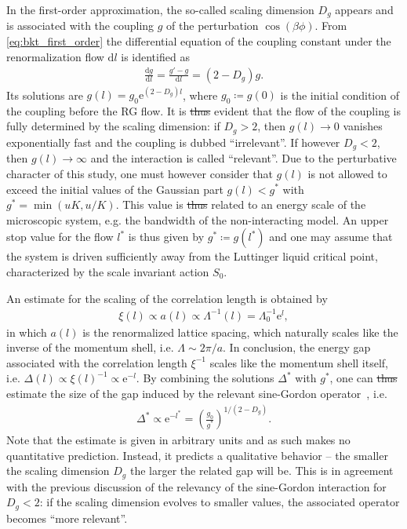 \documentclass{svmono}
\def\re{\mathrm e}
\def\rd{\mathrm d}
\newcommand{\brlr}[1]{\left( #1 \right)}
\providecommand{\DIFdeltex}[1]{{\protect\color{red}\sout{#1}}}                      %
\providecommand{\DIFdelbegin}{} %
\providecommand{\DIFdelend}{} %
\providecommand{\DIFdel}[1]{\texorpdfstring{\DIFdeltex{#1}}{}} %
\newcommand{\DIFscaledelfig}{0.5}
\newlength{\DIFdelgraphicswidth} %
\newlength{\DIFdelgraphicsheight} %
\newcommand{\DIFdelincludegraphics}[2][]{%
\sbox{\DIFdelgraphicsbox}{\DIFOincludegraphics[#1]{#2}}%
\settoboxwidth{\DIFdelgraphicswidth}{\DIFdelgraphicsbox} %
\settoboxtotalheight{\DIFdelgraphicsheight}{\DIFdelgraphicsbox} %
\scalebox{\DIFscaledelfig}{%
\parbox[b]{\DIFdelgraphicswidth}{\usebox{\DIFdelgraphicsbox}\\[-\baselineskip] \rule{\DIFdelgraphicswidth}{0em}}\llap{\resizebox{\DIFdelgraphicswidth}{\DIFdelgraphicsheight}{%
\setlength{\unitlength}{\DIFdelgraphicswidth}%
\begin{picture}(1,1)%
\thicklines\linethickness{2pt} %
{\color[rgb]{1,0,0}\put(0,0){\framebox(1,1){}}}%
{\color[rgb]{1,0,0}\put(0,0){\line( 1,1){1}}}%
{\color[rgb]{1,0,0}\put(0,1){\line(1,-1){1}}}%
\end{picture}%
}\hspace*{3pt}}} %
} %
\DeclareRobustCommand{\DIFdelbegin}{\DIFOdelbegin \let\includegraphics\DIFdelincludegraphics} %
\DeclareRobustCommand{\DIFdelend}{\DIFOaddend \let\includegraphics\DIFOincludegraphics} %
\begin{document}
In the first-order approximation, the so-called scaling dimension $D_g$ appears and is associated with the coupling $g$ of the perturbation $\cos(\beta\phi)$.
From \cref{eq:bkt_first_order} the differential equation of the coupling constant under the renormalization flow $\rd l$ is identified as
\begin{align}
    \frac{\rd g}{\rd l} = \frac{g'-g}{\rd l} = (2-D_g)g.
\end{align}
Its solutions are $g(l) = g_0\re^{(2-D_g)l}$, where $g_0\coloneqq g(0)$ is the initial condition of the coupling before the RG flow.
It is \DIFdelbegin \DIFdel{thus }\DIFdelend evident that the flow of the coupling is fully determined by the scaling dimension: if $D_g>2$, then $g(l)\rightarrow0$ vanishes exponentially fast and the coupling is dubbed ``irrelevant''.
If however $D_g<2$, then $g(l)\rightarrow\infty$ and the interaction is called ``relevant''.
Due to the perturbative character of this study, one must however consider that $g(l)$ is not allowed to exceed the initial values of the Gaussian part $g(l)<g^*$ with $g^*=\min(uK,u/K)$.
This value is \DIFdelbegin \DIFdel{thus }\DIFdelend related to an energy scale of the microscopic system, e.g. the bandwidth of the non-interacting model.
An upper stop value for the flow $l^*$ is thus given by $g^*\coloneqq g(l^*)$ and one may assume that the system is driven sufficiently away from the Luttinger liquid critical point, characterized by the scale invariant action $S_0$.

An estimate for the scaling of the correlation length is obtained by
\begin{align}
    \xi(l) \propto a(l) \propto \Lambda^{-1}(l) = \Lambda^{-1}_0\re^{l},
    \label{eq:correlation_length_rg_flow}
\end{align}
in which $a(l)$ is the renormalized lattice spacing, which naturally scales like the inverse of the momentum shell, i.e. $\Lambda\sim2\pi/a$.
In conclusion, the energy gap associated with the correlation length $\xi^{-1}$ scales like the momentum shell itself, i.e. $\Delta(l)\propto\xi(l)^{-1}\propto\re^{-l}$.
By combining the solutions $\Delta^*$ with $g^*$, one can \DIFdelbegin \DIFdel{thus }\DIFdelend estimate the size of the gap induced by the relevant sine-Gordon operator~\cite{Gogolin2004}, i.e.
\begin{align}
    {\Delta^*}\propto\re^{-l^*}=\brlr{\frac{g_0}{g^*}}^{1/(2-D_g)}.
\end{align}
Note that the estimate is given in arbitrary units and as such makes no quantitative prediction.
Instead, it predicts a qualitative behavior -- the smaller the scaling dimension $D_g$ the larger the related gap will be.
This is in agreement with the previous discussion of the relevancy of the sine-Gordon interaction for $D_g<2$: if the scaling dimension evolves to smaller values, the associated operator becomes ``more relevant''.
\end{document}
